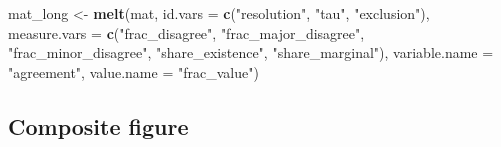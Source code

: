 \documentclass[
  11pt,
]{article}
\newenvironment{Shaded}{\begin{snugshade}}{\end{snugshade}}
\newcommand{\AttributeTok}[1]{\textcolor[rgb]{0.13,0.29,0.53}{#1}}
\newcommand{\FunctionTok}[1]{\textcolor[rgb]{0.13,0.29,0.53}{\textbf{#1}}}
\newcommand{\NormalTok}[1]{#1}
\newcommand{\OtherTok}[1]{\textcolor[rgb]{0.56,0.35,0.01}{#1}}
\newcommand{\StringTok}[1]{\textcolor[rgb]{0.31,0.60,0.02}{#1}}
\begin{document}
\begin{Shaded}
\begin{Highlighting}[]
\NormalTok{mat\_long }\OtherTok{\textless{}{-}} \FunctionTok{melt}\NormalTok{(mat, }\AttributeTok{id.vars =} \FunctionTok{c}\NormalTok{(}\StringTok{"resolution"}\NormalTok{, }\StringTok{"tau"}\NormalTok{, }\StringTok{"exclusion"}\NormalTok{),}
                 \AttributeTok{measure.vars =} \FunctionTok{c}\NormalTok{(}\StringTok{"frac\_disagree"}\NormalTok{, }\StringTok{"frac\_major\_disagree"}\NormalTok{,}
                                  \StringTok{"frac\_minor\_disagree"}\NormalTok{, }\StringTok{"share\_existence"}\NormalTok{,}
                                  \StringTok{"share\_marginal"}\NormalTok{),}
                 \AttributeTok{variable.name =} \StringTok{"agreement"}\NormalTok{, }\AttributeTok{value.name =} \StringTok{"frac\_value"}\NormalTok{)}
\end{Highlighting}
\end{Shaded}

\subsection{Composite figure}\label{composite-figure}
\end{document}
